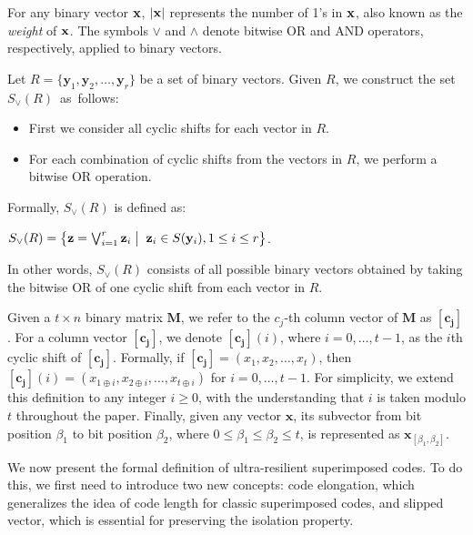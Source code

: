 \documentclass[11pt]{article}
\begin{document}
For any binary vector ${\bf x}$, $|{\bf x}|$ represents the number of 1's in ${\bf x}$, 
also known as the \textit{weight} of ${\bf x}$. The symbols $\vee$ and $\wedge$ denote 
bitwise OR and AND operators, respectively, applied to binary vectors.

Let $R = \{\mathbf{y}_1, \mathbf{y}_2, \ldots, \mathbf{y}_r\}$ be a set of binary vectors. 
Given $R$, we 
construct 
the 
set $S_{\vee}(R)$~as~follows:

\vspace*{-0.5ex}
\begin{itemize}
    \item First we consider all cyclic shifts for each vector in $R$. 
\vspace*{-0.5ex}
    \item For each combination of cyclic shifts from the vectors in $R$, we perform a bitwise OR operation.
\end{itemize}

\vspace*{-0.5ex}
Formally, $S_{\vee}(R)$ is defined as:
\begin{center}
$   S_{\vee}(R) = 
   \left\{ 
         {\mathbf z} = \bigvee_{i=1}^r {\mathbf z}_i  \; \big|\;\;  {\mathbf z}_i \in S({\mathbf y}_i),  1 \le i \le r 
   \right\}$.
\end{center}
In other words, $S_{\vee}(R)$ consists of all possible binary vectors obtained by 
taking the bitwise OR of one cyclic shift from each vector in $R$.

Given a $t \times n$ binary matrix $\mathbf{M}$, we refer to the $c_j$-th column vector of $\mathbf{M}$ as $\mathbf{[c_j]}$. For a column vector $\mathbf{[c_j]}$, 
we denote $\mathbf{[c_j]}(i)$, where $i=0, \ldots, t-1$, as the $i$th cyclic shift of $\mathbf{[c_j]}$. 
Formally, if $\mathbf{[c_j]} = (x_1, x_2, \ldots , x_t)$, then $\mathbf{[c_j]}(i) 
= (x_{1\oplus i}, x_{2\oplus i}, \ldots , x_{t\oplus i})$ for $i=0, \ldots, t-1$. 
For simplicity, we extend this definition to any integer $i \ge 0$, with the understanding that 
$i$ is taken modulo $t$ throughout the paper.
Finally, given any vector $\mathbf{x}$, its subvector 
from bit position $\beta_1$ to bit position $\beta_2$, where $0 \leq \beta_1 \leq \beta_2 \leq t$, is represented as $\mathbf{x}_{[\beta_1,\beta_2]}$.






We now present the formal definition of ultra-resilient superimposed codes. To do this, we first need to introduce two new concepts: code elongation, which generalizes the idea of code length for classic superimposed codes, and slipped vector, which is essential for preserving the isolation property.
\end{document}
